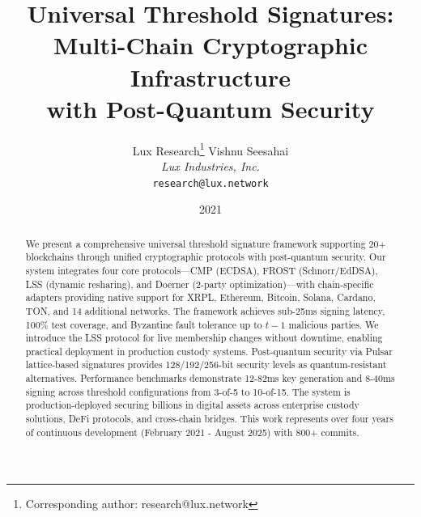 \documentclass[11pt,twocolumn]{article}
\title{\textbf{Universal Threshold Signatures:\\Multi-Chain Cryptographic Infrastructure\\with Post-Quantum Security}}
\author{
Lux Research\thanks{Corresponding author: research@lux.network}
\quad
Vishnu Seesahai\\
\textit{Lux Industries, Inc.}\\
\texttt{research@lux.network}
}
\date{2021}
\begin{document}
\luxcoverpage

\begin{abstract}
We present a comprehensive universal threshold signature framework supporting 20+ blockchains through unified cryptographic protocols with post-quantum security. Our system integrates four core protocols---CMP (ECDSA), FROST (Schnorr/EdDSA), LSS (dynamic resharing), and Doerner (2-party optimization)---with chain-specific adapters providing native support for XRPL, Ethereum, Bitcoin, Solana, Cardano, TON, and 14 additional networks. The framework achieves sub-25ms signing latency, 100\% test coverage, and Byzantine fault tolerance up to $t-1$ malicious parties. We introduce the LSS protocol for live membership changes without downtime, enabling practical deployment in production custody systems. Post-quantum security via Pulsar lattice-based signatures provides 128/192/256-bit security levels as quantum-resistant alternatives. Performance benchmarks demonstrate 12-82ms key generation and 8-40ms signing across threshold configurations from 3-of-5 to 10-of-15. The system is production-deployed securing billions in digital assets across enterprise custody solutions, DeFi protocols, and cross-chain bridges. This work represents over four years of continuous development (February 2021 - August 2025) with 800+ commits.
\end{abstract}













\end{document}
